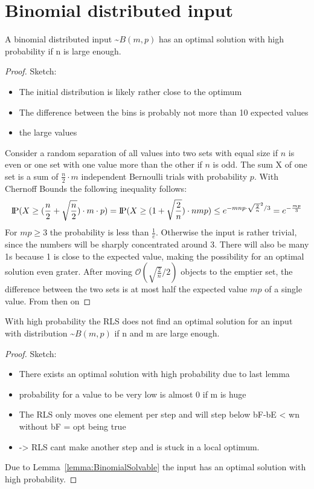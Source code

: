 \section{Binomial distributed input}
\begin{lemma}\label{lemma:BinomialSolvable}
    A binomial distributed input \textasciitilde$B(m,p)$ has an optimal solution with high probability if n is large enough.
\end{lemma}
\begin{proof}
    Sketch:
    \begin{itemize}
        \item The initial distribution is likely rather close to the optimum
        \item The difference between the bins is probably not more than 10 expected values
        \item the large values  
    \end{itemize}
    Consider a random separation of all values into two sets with equal size if $n$ is even or one set with one value more than the other if $n$ is odd. The sum X of one set is a sum of $\frac{n}{2}\cdot m$ independent Bernoulli trials with probability $p$. With Chernoff Bounds the following inequality follows: 
    \[\text{I\kern-0.15em P}(X\ge(\frac{n}{2}+\sqrt{\frac{n}{2}})\cdot m \cdot p) = \text{I\kern-0.15em P}(X\ge(1+\sqrt{\frac{2}{n}})\cdot nmp) \le e^{-mnp\cdot\sqrt{\frac{2}{n}}^2 /3} = e^{-\frac{mp}{3}}\]
    For $mp\ge3$ the probability is less than $\frac{1}{e}$. Otherwise the input is rather trivial, since the numbers will be sharply concentrated around 3. There will also be many 1s because 1 is close to the expected value, making the possibility for an optimal solution even grater.\newline
    After moving $\mathcal{O}(\sqrt{\frac{2}{n}}/2)$ objects to the emptier set, the difference between the two sets is at most half the expected value $mp$ of a single value. From then on 
\end{proof}


\begin{lemma}
    With high probability the RLS does not find an optimal solution for an input with distribution \textasciitilde$B(m,p)$ if n and m are large enough.
\end{lemma}
\begin{proof}
    Sketch:
    \begin{itemize}
        \item There exists an optimal solution with high probability due to last lemma
        \item probability for a value to be very low is almost 0 if m is huge
        \item The RLS only moves one element per step and will step below bF-bE < wn without bF = opt being true
        \item -> RLS cant make another step and is stuck in a local optimum.
    \end{itemize}
    Due to Lemma~\ref{lemma:BinomialSolvable} the input has an optimal solution with high probability.
\end{proof}